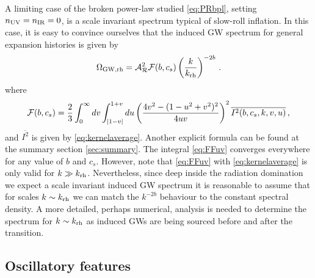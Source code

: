 \documentclass[a4paper,11pt]{article}
\numberwithin{equation}{section}
\begin{document}
A limiting case of the broken power-law studied \eqref{eq:PRbpl}, setting $n_{\rm UV}=n_{\rm IR}=0$, is a scale invariant spectrum typical of slow-roll inflation. In this case, it is easy to convince ourselves that the induced GW spectrum for general expansion histories is given by 
\begin{equation}\label{eq:Phflatfinal}
\Omega_{\rm GW,rh}={\cal A}^2_{\cal R}{\cal F}(b,c_s)\left(\frac{k}{k_{\rm rh}}\right)^{-2b}\,.
\end{equation}
where 
\begin{align}\label{eq:FFuv}
{\cal F}(b,c_s)=\frac{2}{3}\int_0^\infty dv\int_{|1-v|}^{1+v}du\left(\frac{4v^2-(1-u^2+v^2)^2}{4uv}\right)^2 \overline{I^2(b,c_s,k,v,u)}\,,
\end{align}
and $\overline{I^2}$ is given by \eqref{eq:kernelaverage}. Another explicit formula can be found at the summary section \ref{sec:summary}. The integral \eqref{eq:FFuv} converges everywhere for any value of $b$ and $c_s$. However, note that \eqref{eq:FFuv} with \eqref{eq:kernelaverage} is only valid for $k\gg k_{\rm rh}$. Nevertheless, since deep inside the radiation domination we expect a scale invariant induced GW spectrum it is reasonable to assume that for scales $k\sim k_{\rm rh}$ we can match the $k^{-2b}$ behaviour to the constant spectral density. A more detailed, perhaps numerical, analysis is needed to determine the spectrum for $k\sim k_{\rm rh}$ as induced GWs are being sourced before and after the transition.

\subsection{Oscillatory features \label{sec:oscillatory}}
\end{document}

